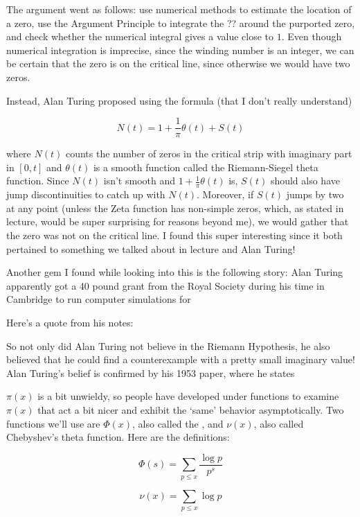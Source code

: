 \documentclass{article}
\theoremstyle{definition}
\begin{document}
The argument went as follows: use numerical methods to estimate the location
of a zero, use the Argument Principle to integrate
the ?? around the purported zero, and check whether the numerical integral
gives a value close to $ 1 $. Even though numerical integration is imprecise,
since the winding number is an integer, we can be certain that the zero is on
the critical line, since otherwise we would have two zeros.

Instead, Alan Turing proposed using the formula (that I don't really understand)

\[ N(t) = 1 + \frac{1}{\pi} \theta(t) + S(t) \]

where $N(t)$ counts the number of zeros in the critical strip with imaginary part 
in $ [0,t] $ and  $ \theta(t) $ is a smooth function called the Riemann-Siegel theta function.
Since $ N(t) $ isn't smooth and $ 1 + \frac{1}{\pi} \theta(t) $ is, $ S(t) $ should 
also have jump discontinuities to catch up with $ N(t) $. Moreover, if $ S(t) $ jumps 
by two at any point (unless the Zeta function has non-simple zeros, which, as stated in lecture,
would be super surprising for reasons beyond me), we would gather that the zero was not on the
critical line. I found this super interesting since it both pertained to something we talked about
in lecture and Alan Turing!

Another gem I found while looking into this is the following story: 
Alan Turing apparently got a 40 pound grant from the Royal Society during his time
in Cambridge to run computer simulations for 

Here's a quote from his notes:


So not only did Alan Turing not believe in the Riemann Hypothesis, he also believed that he
could find a counterexample with a pretty small imaginary value! Alan Turing's belief is confirmed by his
1953 paper, where he states

\newpage

$ \pi(x) $ is a bit unwieldy, so people have developed under functions to examine
$ \pi(x) $ that act a bit nicer and exhibit the `same' behavior asymptotically. Two
functions we'll use are $ \Phi(x) $, also called the , and $ \nu(x) $, also called
Chebyshev's theta function. Here are the definitions:

\[ \Phi(s) = \sum_{p \leq x} \frac{\log p }{p^{s}}\]

\[ \nu(x) = \sum_{p \leq x} \log p \]



 
   

 
\end{document}

